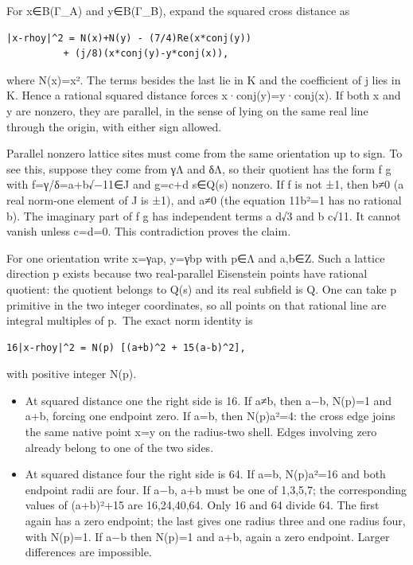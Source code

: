 \documentclass[
  11pt,
]{article}
\providecommand{\tightlist}{%
  \setlength{\itemsep}{0pt}\setlength{\parskip}{0pt}}
\begin{document}
For x∈B(Γ\_A) and y∈B(Γ\_B), expand the squared cross distance as

\begin{verbatim}
|x-rhoy|^2 = N(x)+N(y) - (7/4)Re(x*conj(y))
          + (j/8)(x*conj(y)-y*conj(x)),
\end{verbatim}

where N(x)=\textbar x\textbar². The terms besides the last lie in K and
the coefficient of j lies in K. Hence a rational squared distance forces
x·conj(y)=y·conj(x). If both x and y are nonzero, they are parallel, in
the sense of lying on the same real line through the origin, with either
sign allowed.

Parallel nonzero lattice sites must come from the same orientation up to
sign. To see this, suppose they come from γΛ and δΛ, so their quotient
has the form f g with f=γ/δ=a+b√−11∈J and g=c+d s∈Q(s) nonzero. If f is
not ±1, then b≠0 (a real norm-one element of J is ±1), and a≠0 (the
equation 11b²=1 has no rational b). The imaginary part of f g has
independent terms a d√3 and b c√11. It cannot vanish unless c=d=0. This
contradiction proves the claim.

For one orientation write x=γap, y=γbp with p∈Λ and a,b∈Z. Such a
lattice direction p exists because two real-parallel Eisenstein points
have rational quotient: the quotient belongs to Q(s) and its real
subfield is Q. One can take p primitive in the two integer coordinates,
so all points on that rational line are integral multiples of p.~The
exact norm identity is

\begin{verbatim}
16|x-rhoy|^2 = N(p) [(a+b)^2 + 15(a-b)^2],
\end{verbatim}

with positive integer N(p).

\begin{itemize}
\tightlist
\item
  At squared distance one the right side is 16. If a≠b, then
  \textbar a−b, N(p)=1 and \textbar a+b, forcing one
  endpoint zero. If a=b, then N(p)a²=4: the cross edge joins the same
  native point x=y on the radius-two shell. Edges involving zero already
  belong to one of the two sides.
\item
  At squared distance four the right side is 64. If a=b, N(p)a²=16 and
  both endpoint radii are four. If \textbar a−b,
  \textbar a+b\textbar{} must be one of 1,3,5,7; the corresponding
  values of (a+b)²+15 are 16,24,40,64. Only 16 and 64 divide 64. The
  first again has a zero endpoint; the last gives one radius three and
  one radius four, with N(p)=1. If \textbar a−b then N(p)=1
  and \textbar a+b, again a zero endpoint. Larger differences
  are impossible.
\end{itemize}
\end{document}
